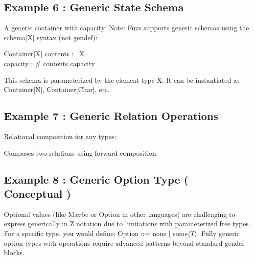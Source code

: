 \documentclass[a4paper,10pt,fleqn]{article}
\begin{document}
\bigskip

\subsection*{Example 6 : Generic State Schema}

\noindent A generic container with capacity:  Note: Fuzz supports generic schemas using the schema[X] syntax (not gendef):

\bigskip

\begin{schema}{Container}[X]
contents : \seq~X \\
capacity : \nat
\where
\# contents \leq capacity
\end{schema}

\noindent This schema is parameterized by the element type X. It can be instantiated as Container[N], Container[Char], etc.

\bigskip

\subsection*{Example 7 : Generic Relation Operations}

\noindent Relational composition for any types:

\bigskip


\noindent Composes two relations using forward composition.

\bigskip

\subsection*{Example 8 : Generic Option Type ( Conceptual )}

\noindent Optional values (like Maybe or Option in other languages) are challenging to express generically in Z notation due to limitations with parameterized free types. For a specific type, you would define: Option ::= none $|$ some$\langle T \rangle$. Fully generic option types with operations require advanced patterns beyond standard gendef blocks.
\end{document}
